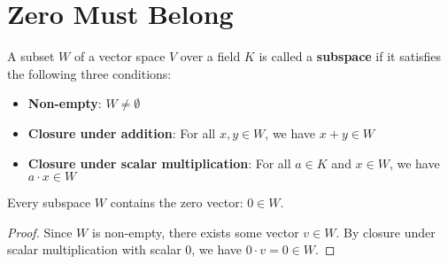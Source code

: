 \section{Zero Must Belong}

\begin{definition}
  \label{definition : Subspace}
  \leanok
  A subset $W$ of a vector space $V$ over a field $K$ is called a \textbf{subspace} if it satisfies the following three conditions:
  \begin{itemize}
    \item \textbf{Non-empty}: $W \neq \emptyset$
    \item \textbf{Closure under addition}: For all $x, y \in W$, we have $x + y \in W$
    \item \textbf{Closure under scalar multiplication}: For all $a \in K$ and $x \in W$, we have $a \cdot x \in W$
  \end{itemize}
\end{definition}

\begin{theorem}
  \label{theorem : subspace_contains_zero}
  \leanok
  Every subspace $W$ contains the zero vector: $0 \in W$.
\end{theorem}

\begin{proof}
  Since $W$ is non-empty, there exists some vector $v \in W$. By closure under scalar multiplication with scalar $0$, we have $0 \cdot v = 0 \in W$.
\end{proof}